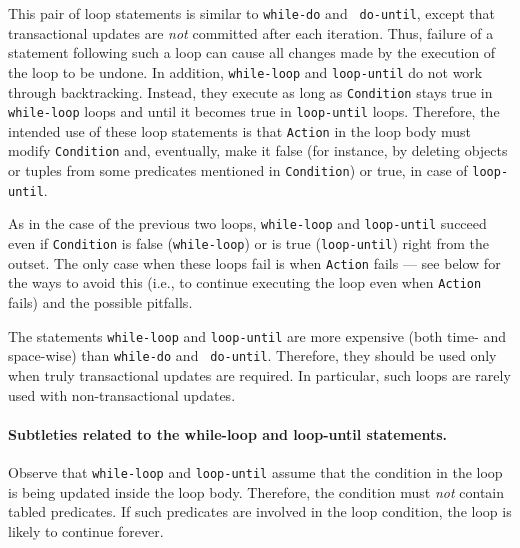 \documentclass[11pt]{article}
\newcommand{\bs}{\textbackslash}
\begin{document}
\index{\bs{}until}
This pair of loop statements is similar to {\tt while-do} and {\tt
  do-until}, except that transactional updates are \emph{not} committed
after each iteration. Thus, failure of a statement following such a loop
can cause all changes made by the execution of the loop to be undone.  In
addition, {\tt while-loop} and {\tt loop-until} do not work through
backtracking. Instead, they execute as long as {\tt Condition} stays true
in \texttt{while-loop} loops and until it becomes true in
\texttt{loop-until} loops.  
Therefore, the intended use of these loop statements is that {\tt Action}
in the loop body must modify {\tt Condition} and, eventually, make it false
(for instance, by deleting objects or tuples from some predicates mentioned
in {\tt Condition}) or true, in case of \texttt{loop-until}. 
  
As in the case of the previous two loops, {\tt while-loop} and
{\tt loop-until} succeed even if {\tt Condition} is false (\texttt{while-loop})
or is true (\texttt{loop-until})
right from the
outset. The only case when these loops fail is when {\tt Action} fails ---
see below for the ways to avoid this (i.e.,
to continue executing the loop even when {\tt Action} fails) and the
possible pitfalls.


The statements {\tt while-loop} and {\tt loop-until} are more
expensive (both time- and space-wise) than {\tt while-do} and {\tt
  do-until}. Therefore, they should be used only when truly transactional
updates are required. In particular, such loops are rarely used with
non-transactional updates.

\paragraph{Subtleties related to the while-loop and loop-until statements.}
Observe that {\tt while-loop} and {\tt loop-until} assume that the
condition in the loop is being updated inside the loop body.  Therefore,
the condition must \emph{not} contain tabled predicates.  If such
predicates are involved in the loop condition, the loop is likely to
continue forever.
\end{document}
